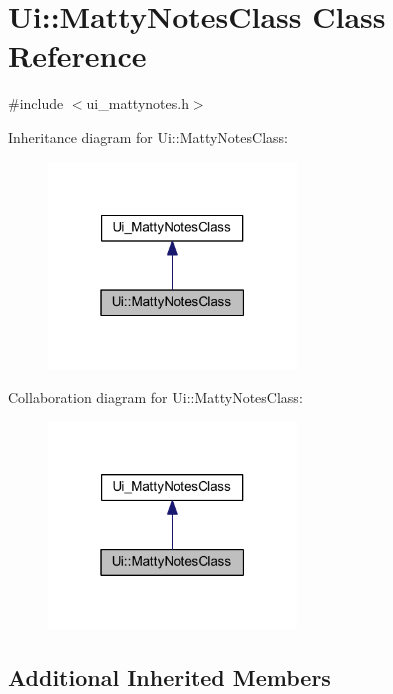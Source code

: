 \hypertarget{classUi_1_1MattyNotesClass}{}\section{Ui\+:\+:Matty\+Notes\+Class Class Reference}
\label{classUi_1_1MattyNotesClass}


{\ttfamily \#include $<$ui\+\_\+mattynotes.\+h$>$}



Inheritance diagram for Ui\+:\+:Matty\+Notes\+Class\+:
\nopagebreak
\begin{figure}[H]
\begin{center}
\leavevmode
\includegraphics[width=187pt]{classUi_1_1MattyNotesClass__inherit__graph}
\end{center}
\end{figure}


Collaboration diagram for Ui\+:\+:Matty\+Notes\+Class\+:
\nopagebreak
\begin{figure}[H]
\begin{center}
\leavevmode
\includegraphics[width=187pt]{classUi_1_1MattyNotesClass__coll__graph}
\end{center}
\end{figure}
\subsection*{Additional Inherited Members}


